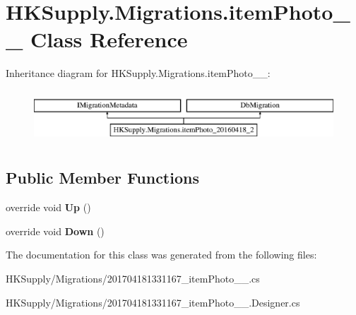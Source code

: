 \hypertarget{class_h_k_supply_1_1_migrations_1_1item_photo__20160418__2}{}\section{H\+K\+Supply.\+Migrations.\+item\+Photo\+\_\+\_ Class Reference}
\label{class_h_k_supply_1_1_migrations_1_1item_photo__20160418__2}
Inheritance diagram for H\+K\+Supply.\+Migrations.\+item\+Photo\+\_\+\_\+:\begin{figure}[H]
\begin{center}
\leavevmode
\includegraphics[height=2.000000cm]{class_h_k_supply_1_1_migrations_1_1item_photo__20160418__2}
\end{center}
\end{figure}
\subsection*{Public Member Functions}
\begin{DoxyCompactItemize}
\item 
\mbox{\label{class_h_k_supply_1_1_migrations_1_1item_photo__20160418__2_a50c0168c748dfa4c6de40affd1ce2548}} 
override void {\bfseries Up} ()
\item 
\mbox{\label{class_h_k_supply_1_1_migrations_1_1item_photo__20160418__2_ae1a2e23635afd9ed84ba55786d8c7de5}} 
override void {\bfseries Down} ()
\end{DoxyCompactItemize}


The documentation for this class was generated from the following files\+:\begin{DoxyCompactItemize}
\item 
H\+K\+Supply/\+Migrations/201704181331167\+\_\+item\+Photo\+\_\+\_.\+cs\item 
H\+K\+Supply/\+Migrations/201704181331167\+\_\+item\+Photo\+\_\+\_.\+Designer.\+cs\end{DoxyCompactItemize}
